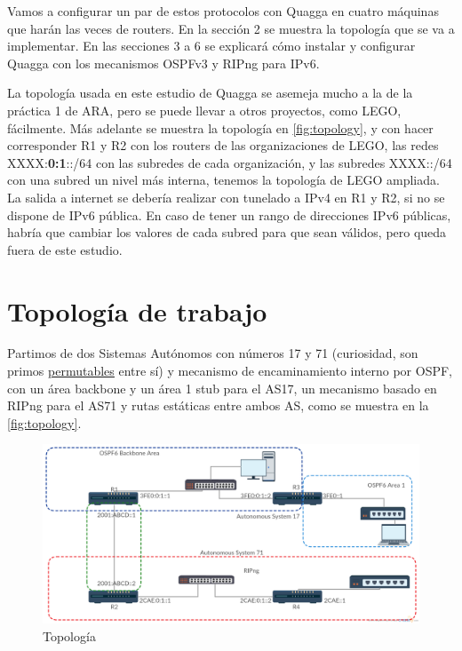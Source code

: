 \documentclass{article}
\begin{document}
Vamos a configurar un par de estos protocolos con Quagga en cuatro máquinas que harán las veces de routers.
En la sección 2 se muestra la topología que se va a implementar. En las secciones 3 a 6 se explicará cómo instalar y configurar Quagga con los mecanismos OSPFv3 y RIPng para IPv6.

La topología usada en este estudio de Quagga se asemeja mucho a la de la práctica 1 de ARA, pero se puede llevar a otros proyectos, como LEGO, fácilmente. Más adelante se muestra la topología en \autoref{fig:topology}, y con hacer corresponder R1 y R2 con los routers de las organizaciones de LEGO, las redes XXXX:\textbf{0:1}::/64 con las subredes de cada organización, y las subredes XXXX::/64 con una subred un nivel más interna, tenemos la topología de LEGO ampliada. La salida a internet se debería realizar con tunelado a IPv4 en R1 y R2, si no se dispone de IPv6 pública. En caso de tener un rango de direcciones IPv6 públicas, habría que cambiar los valores de cada subred para que sean válidos, pero queda fuera de este estudio.

\section{Topología de trabajo}


Partimos de dos Sistemas Autónomos con números 17 y 71 (curiosidad, son primos \hyperref{https://en.wikipedia.org/wiki/Permutable_prime}{}{}{\underline{permutables}}  entre sí) y mecanismo de encaminamiento interno por OSPF, con un área backbone y un área 1 stub para el AS17, un mecanismo basado en RIPng para el AS71 y rutas estáticas entre ambos AS, como se muestra en la \autoref{fig:topology}.


\begin{figure}[!h]
	\centering
	\includegraphics[scale=0.29]{images/Topology.png}
	\caption{Topología}
	\label{fig:topology}
\end{figure}
\end{document}
